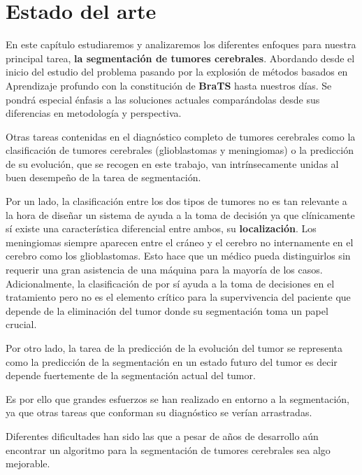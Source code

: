 \chapter{Estado del arte}

En este capítulo estudiaremos y analizaremos los diferentes enfoques para nuestra principal tarea, \textbf{la segmentación de tumores cerebrales}. Abordando desde el inicio del estudio del problema pasando por la explosión de métodos basados en Aprendizaje profundo con la constitución de \textbf{BraTS} hasta nuestros días. Se pondrá especial énfasis a las soluciones actuales comparándolas desde sus diferencias en metodología y perspectiva.

Otras tareas contenidas en el diagnóstico completo de tumores cerebrales como la clasificación de tumores cerebrales (glioblastomas y meningiomas) o la predicción de su evolución, que se recogen en este trabajo, van intrínsecamente unidas al buen desempeño de la tarea de segmentación. 

Por un lado, la clasificación entre los dos tipos de tumores no es tan relevante a la hora de diseñar un sistema de ayuda a la toma de decisión ya que clínicamente sí existe una característica diferencial entre ambos, su \textbf{localización}. Los meningiomas siempre aparecen entre el cráneo y el cerebro no internamente en el cerebro como los glioblastomas. Esto hace que un médico pueda distinguirlos sin requerir una gran asistencia de una máquina para la mayoría de los casos. Adicionalmente, la clasificación de por sí ayuda a la toma de decisiones en el tratamiento pero no es el elemento crítico para la supervivencia del paciente que depende de la eliminación del tumor donde su segmentación toma un papel crucial.

Por otro lado, la tarea de la predicción de la evolución del tumor se representa como la predicción de la segmentación en un estado futuro del tumor es decir depende fuertemente de la segmentación actual del tumor. 

Es por ello que grandes esfuerzos se han realizado en entorno a la segmentación, ya que otras tareas que conforman su diagnóstico se verían arrastradas.

Diferentes dificultades han sido las que a pesar de años de desarrollo aún encontrar un algoritmo para la segmentación de tumores cerebrales sea algo mejorable. 

